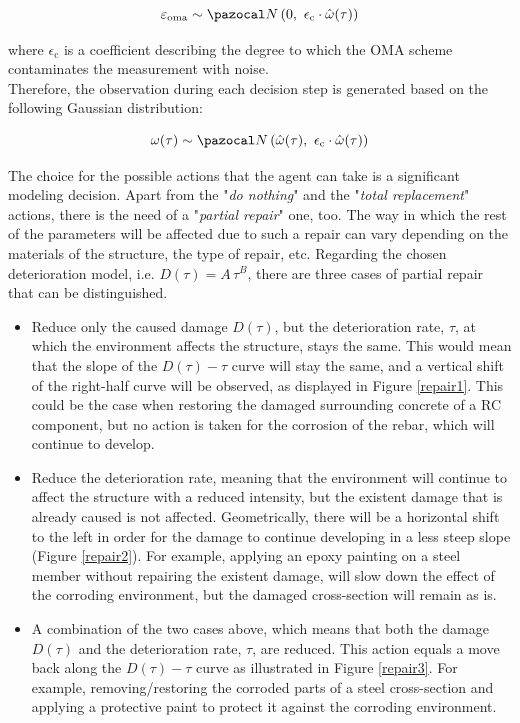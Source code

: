 \begin{equation}
    \varepsilon _{\text{oma}} \sim \ccal{N} \left( 0, \,\, \epsilon _{\text{c}} \cdot \hat{\omega}(\tau) \right)
\end{equation}

where $\epsilon_{\text{c}}$ is a coefficient describing the degree to which the \gls{OMA} scheme contaminates the measurement with noise.\\

Therefore, the observation during each decision step is generated based on the following Gaussian distribution:

\begin{equation}
    \omega (\tau) \sim \ccal{N}\left ( \hat{\omega}(\tau) , \,\, \epsilon_{\text{c}} \cdot \hat{\omega}(\tau) \right) \label{obsDistr}
\end{equation}

The choice for the possible actions that the agent can take is a significant modeling decision. Apart from the "\textit{do nothing}" and the "\textit{total replacement}" actions, there is the need of a "\textit{partial repair}" one, too. The way in which the rest of the parameters will be affected due to such a repair can vary depending on the materials of the structure, the type of repair, etc. Regarding the chosen deterioration model, i.e. $D(\tau) = A\, \tau^B$, there are three cases of partial repair that can be distinguished.

\begin{itemize}
    \item Reduce only the caused damage $D(\tau)$, but the deterioration rate, $\tau$, at which the environment affects the structure, stays the same. This would mean that the slope of the $D(\tau)-\tau$ curve will stay the same, and a vertical shift of the right-half curve will be observed, as displayed in Figure \ref{repair1}. This could be the case when restoring the damaged surrounding concrete of a \gls{RC} component, but no action is taken for the corrosion of the rebar, which will continue to develop.
    \item Reduce the deterioration rate, meaning that the environment will continue to affect the structure with a reduced intensity, but the existent damage that is already caused is not affected. Geometrically, there will be a horizontal shift to the left in order for the damage to continue developing in a less steep slope (Figure \ref{repair2}). For example, applying an epoxy painting on a steel member without repairing the existent damage, will slow down the effect of the corroding environment, but the damaged cross-section will remain as is.  
    \item A combination of the two cases above, which means that both the damage $D(\tau)$ and the deterioration rate, $\tau$, are reduced. This action equals a move back along the $D(\tau) - \tau$ curve as illustrated in Figure \ref{repair3}. For example, removing/restoring the corroded parts of a steel cross-section and applying a protective paint to protect it against the corroding environment.
\end{itemize}

